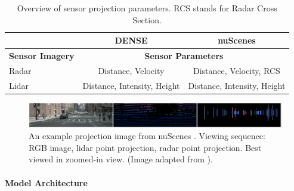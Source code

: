 \documentclass[report.tex]{subfiles}
\begin{document}
    \begin{table}[h]
        \centering
        \caption{Overview of sensor projection parameters. RCS stands for Radar Cross Section.}
        \begin{tabular}{|l|c|c|}
        \hline
        \cline{2-3}
               & DENSE           & nuScenes                        \\
        \hline
        \textbf{Sensor Imagery} & \multicolumn{2}{c|}{\textbf{Sensor Parameters}} \\
        \hline
        Radar & Distance, Velocity & Distance, Velocity, RCS \\
        \hline
        Lidar & Distance, Intensity, Height & Distance, Intensity, Height \\
        \hline
        \end{tabular}
        \label{tab:sensor_projection_parameters}
    \end{table}
    

    \begin{figure}[h]
        \centering
        \includegraphics[width=1.0\textwidth]{images/methods/hrfuser/sample_projection_image.png}
        \caption{An example projection image from nuScenes \cite{caesar2020nuscenes}. Viewing sequence: RGB image, lidar point projection, radar point projection. Best viewed in zoomed-in view. (Image adapted from \cite{broedermann2022hrfuser}).}
        \label{fig:hrfuser_projection_image}
    \end{figure}


    \paragraph*{Model Architecture}

    
\end{document}
